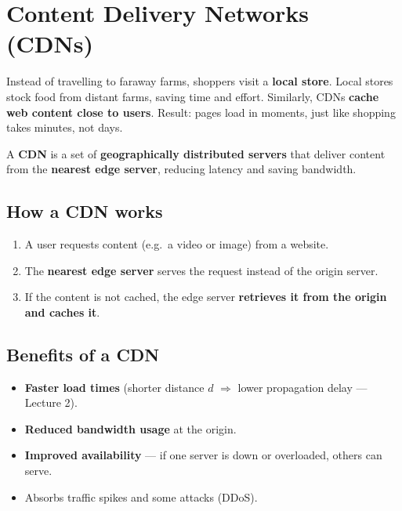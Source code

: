 \section{Content Delivery Networks (CDNs)}

\begin{analogy}
Instead of travelling to faraway farms, shoppers visit a \textbf{local store}. Local stores stock food from distant farms, saving time and effort. Similarly, CDNs \textbf{cache web content close to users}. Result: pages load in moments, just like shopping takes minutes, not days.
\end{analogy}

A \textbf{CDN} is a set of \textbf{geographically distributed servers} that deliver content from the \textbf{nearest edge server}, reducing latency and saving bandwidth.

\subsection{How a CDN works}
\begin{enumerate}
  \item A user requests content (e.g.\ a video or image) from a website.
  \item The \textbf{nearest edge server} serves the request instead of the origin server.
  \item If the content is not cached, the edge server \textbf{retrieves it from the origin and caches it}.
\end{enumerate}

\begin{center}
\end{center}

\subsection{Benefits of a CDN}
\begin{itemize}
  \item \textbf{Faster load times} (shorter distance $d$ $\Rightarrow$ lower propagation delay --- Lecture 2).
  \item \textbf{Reduced bandwidth usage} at the origin.
  \item \textbf{Improved availability} --- if one server is down or overloaded, others can serve.
  \item Absorbs traffic spikes and some attacks (DDoS).
\end{itemize}

